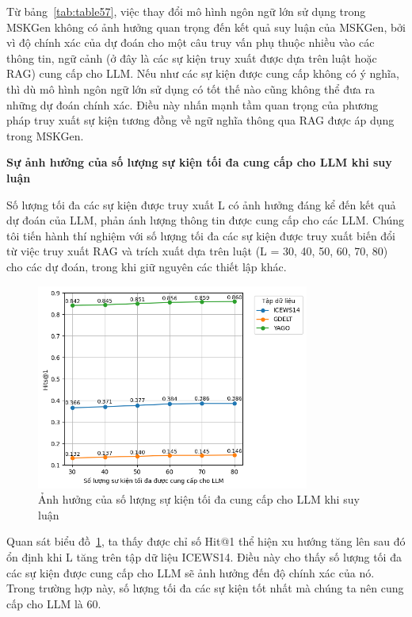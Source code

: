 Từ bảng~\ref{tab:table57}, việc thay đổi mô hình ngôn ngữ lớn sử dụng trong MSKGen không có ảnh hưởng quan trọng
đến kết quả suy luận của MSKGen, bởi vì độ chính xác của dự đoán cho một câu truy vấn phụ thuộc nhiều vào các thông
tin, ngữ cảnh (ở đây là các sự kiện truy xuất được dựa trên luật hoặc RAG) cung cấp cho LLM. Nếu như các sự kiện
được cung cấp không có ý nghĩa, thì dù mô hình ngôn ngữ lớn sử dụng có tốt thế nào cũng không thể đưa ra những dự
đoán chính xác. Điều này nhấn mạnh tầm quan trọng của phương pháp truy xuất sự kiện tương đồng về ngữ nghĩa thông qua RAG
được áp dụng trong MSKGen.

\vspace{1em}
\textbf{Sự ảnh hưởng của số lượng sự kiện tối đa cung cấp cho LLM khi suy luận}

Số lượng tối đa các sự kiện được truy xuất L có ảnh hưởng đáng kể đến kết quả dự đoán của LLM, phản ánh lượng thông
tin được cung cấp cho các LLM. Chúng tôi tiến hành thí nghiệm với số lượng tối đa các sự kiện được truy xuất biến 
đổi từ việc truy xuất RAG và trích xuất dựa trên luật (L = 30, 40, 50, 60, 70, 80) cho các dự đoán, trong khi
giữ nguyên các thiết lập khác.

\begin{figure}[H]
    \centering
    \includegraphics[width=0.8\textwidth]{images/max_number_retrieved_facts.png}
    \caption{Ảnh hưởng của số lượng sự kiện tối đa cung cấp cho LLM khi suy luận}
    \label{fig3: num_semantic_facts}
\end{figure}

Quan sát biểu đồ~\ref{fig3: num_semantic_facts}, ta thấy được chỉ số Hit@1 thể hiện xu hướng tăng lên sau đó
ổn định khi L tăng trên tập dữ liệu ICEWS14. Điều này cho thấy số lượng tối đa các sự kiện được cung cấp cho
LLM sẽ ảnh hưởng đến độ chính xác của nó. Trong trường hợp này, số lượng tối đa các sự kiện tốt nhất mà chúng ta nên cung cấp cho LLM là 60.